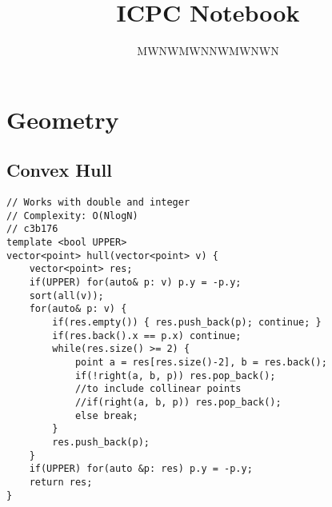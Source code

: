 \documentclass{article}
\title{ICPC Notebook}
\author{MWNWMWNNWMWNWN}
\date{}
\begin{document}
\maketitle
\tableofcontents

\section{Geometry}
\subsection{Convex Hull}
\begin{verbatim}
// Works with double and integer
// Complexity: O(NlogN)
// c3b176
template <bool UPPER>
vector<point> hull(vector<point> v) {
	vector<point> res;
	if(UPPER) for(auto& p: v) p.y = -p.y;
	sort(all(v));
	for(auto& p: v) {
		if(res.empty()) { res.push_back(p); continue; }
		if(res.back().x == p.x) continue;
		while(res.size() >= 2) {
			point a = res[res.size()-2], b = res.back();
			if(!right(a, b, p)) res.pop_back();
			//to include collinear points
			//if(right(a, b, p)) res.pop_back();
			else break;
		}
		res.push_back(p);
	}
	if(UPPER) for(auto &p: res) p.y = -p.y;
	return res;
}
\end{verbatim}
\end{document}
